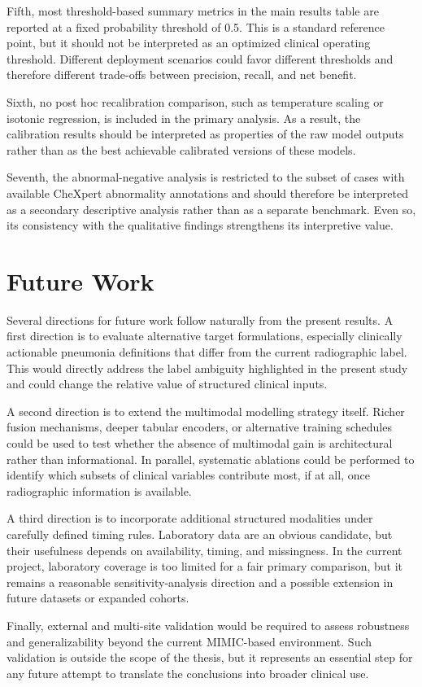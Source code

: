 Fifth, most threshold-based summary metrics in the main results table are reported at a fixed probability threshold of 0.5. This is a standard reference point, but it should not be interpreted as an optimized clinical operating threshold. Different deployment scenarios could favor different thresholds and therefore different trade-offs between precision, recall, and net benefit.

Sixth, no post hoc recalibration comparison, such as temperature scaling or isotonic regression, is included in the primary analysis. As a result, the calibration results should be interpreted as properties of the raw model outputs rather than as the best achievable calibrated versions of these models.

Seventh, the abnormal-negative analysis is restricted to the subset of cases with available CheXpert abnormality annotations and should therefore be interpreted as a secondary descriptive analysis rather than as a separate benchmark. Even so, its consistency with the qualitative findings strengthens its interpretive value.

\section{Future Work}

Several directions for future work follow naturally from the present results. A first direction is to evaluate alternative target formulations, especially clinically actionable pneumonia definitions that differ from the current radiographic label. This would directly address the label ambiguity highlighted in the present study and could change the relative value of structured clinical inputs.

A second direction is to extend the multimodal modelling strategy itself. Richer fusion mechanisms, deeper tabular encoders, or alternative training schedules could be used to test whether the absence of multimodal gain is architectural rather than informational. In parallel, systematic ablations could be performed to identify which subsets of clinical variables contribute most, if at all, once radiographic information is available.

A third direction is to incorporate additional structured modalities under carefully defined timing rules. Laboratory data are an obvious candidate, but their usefulness depends on availability, timing, and missingness. In the current project, laboratory coverage is too limited for a fair primary comparison, but it remains a reasonable sensitivity-analysis direction and a possible extension in future datasets or expanded cohorts.

Finally, external and multi-site validation would be required to assess robustness and generalizability beyond the current MIMIC-based environment. Such validation is outside the scope of the thesis, but it represents an essential step for any future attempt to translate the conclusions into broader clinical use.